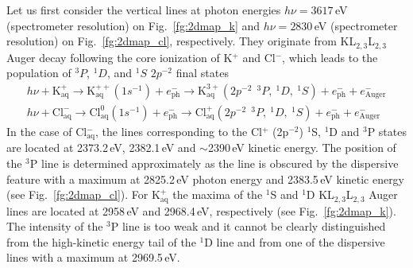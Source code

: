 Let us first consider the vertical lines at photon energies $h\nu = 3617$\,eV {\color{red}(spectrometer resolution)} on Fig.\ \ref{fg:2dmap_k} and $h\nu = 2830$\,eV {\color{red}(spectrometer resolution)} on Fig.\ \ref{fg:2dmap_cl}, respectively. They originate from KL$_{2,3}$L$_{2,3}$ Auger decay following the core ionization of K$^+$ and Cl$^-$, which leads to the population of $^3P$, $^1D$, and $^1S$ $2p^{-2}$ final states
%
\begin{align*}
h\nu + \text{K}_\text{aq}^{+} \rightarrow \text{K}_\text{aq}^{++}(1s^{-1}) + e^{-}_{\text{ph}}
			 \rightarrow \text{K}_\text{aq}^{3+} (2p^{-2}\ \ ^3P,\ ^1D,\ ^1S) + e^{-}_{\text{ph}} + e^{-}_{\text{Auger}} \\
h\nu + \text{Cl}_\text{aq}^{-} \rightarrow \text{Cl}_\text{aq}^{0}(1s^{-1}) + e^{-}_{\text{ph}}
			 \rightarrow \text{Cl}_\text{aq}^{+} (2p^{-2}\ \ ^3P,\ ^1D,\ ^1S) + e^{-}_{\text{ph}} + e^{-}_{\text{Auger}} 
\end{align*}
%
In the case of Cl$^{-}_{\text{aq}}$, the lines corresponding to the Cl$^{+}$ (2p$^{-2}$) $^1$S, $^1$D and $^3$P states are located at 2373.2\,eV, 2382.1\,eV and $\sim$2390\,eV kinetic energy. The position of the $^{3}$P line is determined approximately as the line is obscured by the dispersive feature with a maximum at 2825.2\,eV photon energy and 2383.5\,eV kinetic energy (see Fig.\ \ref{fg:2dmap_cl}). For K$^{+}_{\text{aq}}$ the maxima of the $^1$S and $^1$D KL$_{2,3}$L$_{2,3}$ Auger lines are located at 2958\,eV and 2968.4\,eV, respectively (see Fig.\ \ref{fg:2dmap_k}). The intensity of the $^3$P line is too weak and it cannot be clearly distinguished from the high-kinetic energy tail of the $^1$D line and from one of the dispersive lines with a maximum at 2969.5\,eV.


